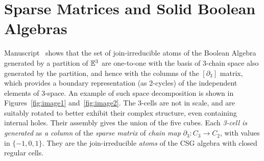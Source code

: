 \section{Sparse Matrices and Solid Boolean Algebras}\label{boolean-algebras}

Manuscript~\cite{paoluzzi2019finite} shows that the set of join-irreducible atoms of the Boolean Algebra generated by a partition of $\mathbb{E}^3$ are one-to-one with the basis of 3-chain space also generated by the partition, and hence with the columns of the $[\partial_3]$ matrix, which provides a boundary representation (as 2-cycles) of the independent elements of 3-space. 
An example of such space decomposition is shown in Figures~\ref{fig:image1} and~\ref{fig:image2}. The 3-cells are not in scale, and are suitably rotated to better exhibit their
complex structure, even containing internal holes. Their assembly gives the union of the five cubes. Each
\emph{3-cell is generated} as \emph{a column} of the \emph{sparse matrix} of
\emph{chain map} $\partial_3: C_3\to C_2$,  with values in $\{-1,0,1\}$.
They are the join-irreducible \emph{atoms} of the CSG algebra with closed regular cells.

